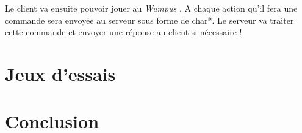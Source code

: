 \documentclass[a4paper,10pt]{article}
\newcommand{\gameName}{\emph{Wumpus }}
\begin{document}
	Le client va ensuite pouvoir jouer au \gameName. A chaque action qu'il fera une commande sera envoyée au serveur sous forme de char*. Le serveur va traiter
	cette commande et envoyer une réponse au client si nécessaire !





	\newpage
	\section{Jeux d'essais}

	\newpage
	\section{Conclusion}

	
\end{document}

